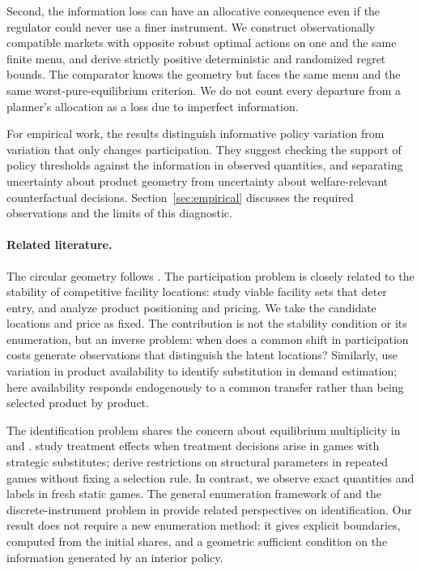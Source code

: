 \documentclass[11pt]{article}
\begin{document}
Second, the information loss can have an allocative consequence even if the regulator could never use a finer instrument. We construct observationally compatible markets with opposite robust optimal actions on one and the same finite menu, and derive strictly positive deterministic and randomized regret bounds. The comparator knows the geometry but faces the same menu and the same worst-pure-equilibrium criterion. We do not count every departure from a planner's allocation as a loss due to imperfect information.

For empirical work, the results distinguish informative policy variation from variation that only changes participation. They suggest checking the support of policy thresholds against the information in observed quantities, and separating uncertainty about product geometry from uncertainty about welfare-relevant counterfactual decisions. Section~\ref{sec:empirical} discusses the required observations and the limits of this diagnostic.

\paragraph{Related literature.} The circular geometry follows \citet{salop1979}. The participation problem is closely related to the stability of competitive facility locations: \citet{dobson1987} study viable facility sets that deter entry, and \citet{rhim2005} analyze product positioning and pricing. We take the candidate locations and price as fixed. The contribution is not the stability condition or its enumeration, but an inverse problem: when does a common shift in participation costs generate observations that distinguish the latent locations? Similarly, \citet{conlon2013} use variation in product availability to identify substitution in demand estimation; here availability responds endogenously to a common transfer rather than being selected product by product.

The identification problem shares the concern about equilibrium multiplicity in \citet{ciliberto2009} and \citet{kline2016}. \citet{balat2023} study treatment effects when treatment decisions arise in games with strategic substitutes; \citet{abito2021} derive restrictions on structural parameters in repeated games without fixing a selection rule. In contrast, we observe exact quantities and labels in fresh static games. The general enumeration framework of \citet{gu2026} and the discrete-instrument problem in \citet{feng2024} provide related perspectives on identification. Our result does not require a new enumeration method: it gives explicit boundaries, computed from the initial shares, and a geometric sufficient condition on the information generated by an interior policy.
\end{document}

